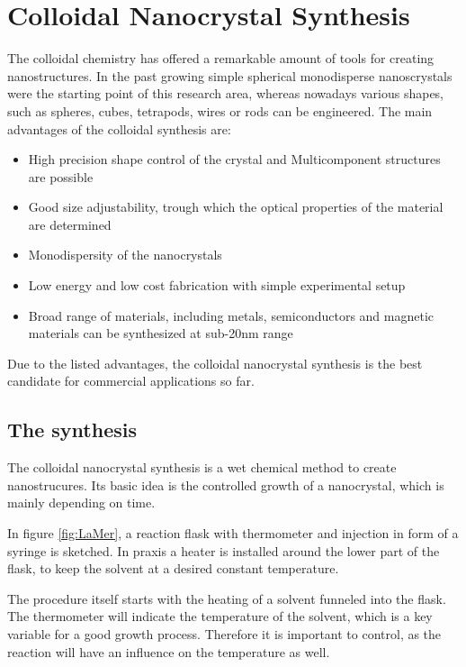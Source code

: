 \chapter{Colloidal Nanocrystal Synthesis} \label{sec:CQDSynthesis}  

	The colloidal chemistry has offered a remarkable amount of tools for creating nanostructures. In the past growing simple spherical monodisperse
	nanoscrystals were the starting point of this research area, whereas nowadays various shapes, such as spheres, cubes, tetrapods,
	wires or rods can be engineered.
	The main advantages of the colloidal synthesis are:
	\begin{itemize}
		\itemsep 0pt
		\item High precision shape control of the crystal and Multicomponent structures are possible
		\item Good size adjustability, trough which the optical properties of the material are determined
		\item Monodispersity of the nanocrystals
		\item Low energy and low cost fabrication with simple experimental setup
		\item Broad range of materials, including metals, semiconductors and magnetic materials can be synthesized at sub-20nm range
	\end{itemize}
	Due to the listed advantages, the colloidal nanocrystal synthesis is the best candidate for commercial applications so far.
	
	\section{The synthesis}
		The colloidal nanocrystal synthesis is a wet chemical method to create nanostrucures. Its basic idea is the controlled growth of a nanocrystal,
		which is mainly depending on time.
		
		In figure \ref{fig:LaMer}, a reaction flask with thermometer and injection in form of a syringe is sketched. In praxis a heater is installed
		around the lower part of the flask, to keep the solvent at a desired constant temperature.
		
		The procedure itself starts with the heating of a solvent funneled into the flask. The thermometer will indicate the temperature of the solvent,
		which is a key variable for a good growth process. Therefore it is important to control, as the reaction will have an influence on the temperature
		as well.
		
